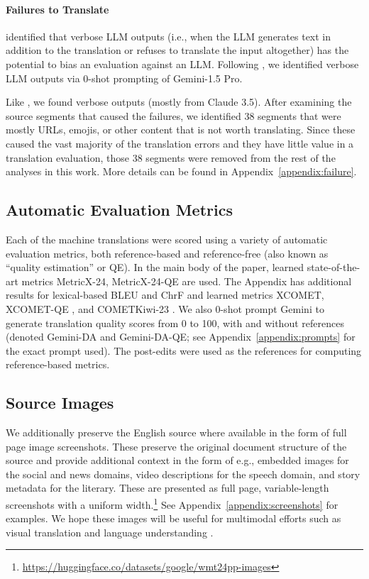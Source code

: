 \paragraph{Failures to Translate}
\citet{briakou2024} identified that verbose LLM outputs (i.e., when the LLM generates text in addition to the translation or refuses to translate the input altogether) has the potential to bias an evaluation against an LLM.
Following \citet{briakou2024}, we identified verbose LLM outputs via 0-shot prompting of Gemini-1.5 Pro.

Like \citet{briakou2024}, we found verbose outputs (mostly from Claude 3.5).
After examining the source segments that caused the failures, we identified 38 segments that were mostly URLs, emojis, or other content that is not worth translating.
Since these caused the vast majority of the translation errors and they have little value in a translation evaluation, those 38 segments were removed from the rest of the analyses in this work.
More details can be found in Appendix~\ref{appendix:failure}.


\subsection{Automatic Evaluation Metrics}

Each of the machine translations were scored using a variety of automatic evaluation metrics, both reference-based and reference-free (also known as ``quality estimation'' or QE).
In the main body of the paper, learned state-of-the-art metrics MetricX-24, MetricX-24-QE \citep{juraska-etal-2024-metricx} are used.
The Appendix has additional results for lexical-based BLEU \citep{papineni-etal-2002-bleu} and ChrF \citep{popovic-2015-chrf} and learned metrics XCOMET, XCOMET-QE \citep{guerreiro-etal-2024-xcomet}, and COMETKiwi-23 \citep{rei-etal-2023-scaling}.
We also 0-shot prompt Gemini to generate translation quality scores from 0 to 100, with and without references (denoted Gemini-DA and Gemini-DA-QE; see Appendix~\ref{appendix:prompts} for the exact prompt used).
The post-edits were used as the references for computing reference-based metrics.


\subsection{Source Images}

We additionally preserve the English source where available in the form of full page image screenshots. 
These preserve the original document structure of the source and  provide additional context in the form of e.g., embedded images for the social and news domains, video descriptions for the speech domain, and story metadata for the literary. 
These are presented as full page, variable-length screenshots with a uniform width.\footnote{\url{https://huggingface.co/datasets/google/wmt24pp-images}} 
See Appendix~\ref{appendix:screenshots} for examples. 
We hope these images will be useful for multimodal efforts such as visual translation and language understanding \citep{salesky-etal-2021-robust,pmlr-v202-lee23g,rust2023language,salesky-etal-2024-benchmarking}. 



